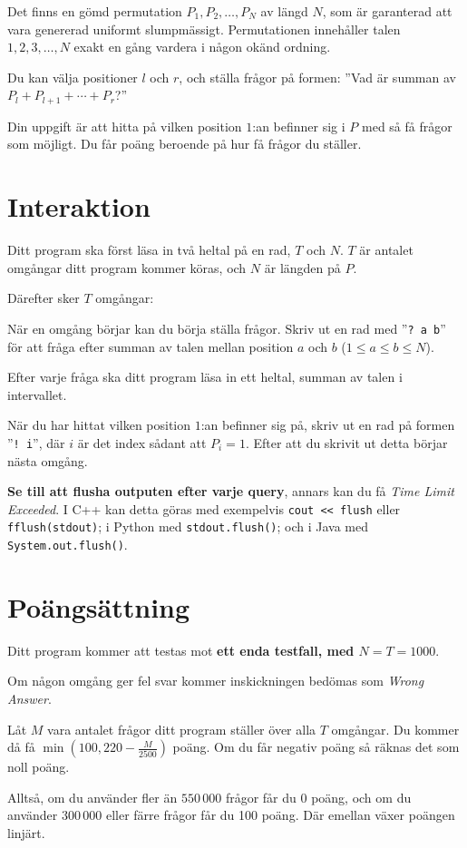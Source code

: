 
Det finns en gömd permutation $P_{1},P_{2},\ldots,P_{N}$ av längd $N$, som är garanterad att vara genererad uniformt slumpmässigt.
Permutationen innehåller talen $1, 2, 3, \ldots, N$ exakt en gång vardera i någon okänd ordning.

Du kan välja positioner $l$ och $r$, och ställa frågor på formen: ''Vad är summan av $P_l + P_{l+1} + \cdots + P_r$?''

Din uppgift är att hitta på vilken position $1$:an befinner sig i $P$ med så få frågor som möjligt.
Du får poäng beroende på hur få frågor du ställer.

\section*{Interaktion}

Ditt program ska först läsa in två heltal på en rad, $T$ och $N$. 
$T$ är antalet omgångar ditt program kommer köras, och $N$ är längden på $P$.

Därefter sker $T$ omgångar:

När en omgång börjar kan du börja ställa frågor. Skriv ut en rad med ''\verb|? a b|'' för
att fråga efter summan av talen mellan position $a$ och $b$ ($1 \leq a \leq b \leq N$).

Efter varje fråga ska ditt program läsa in ett heltal, summan av talen i intervallet.

När du har hittat vilken position $1$:an befinner sig på, skriv ut en rad på formen ''\verb|! i|'',
där $i$ är det index sådant att $P_i = 1$. Efter att du skrivit ut detta börjar nästa omgång.

\textbf{Se till att flusha outputen efter varje query}, annars kan du få \textit{Time Limit Exceeded}.
I C++ kan detta göras med exempelvis \texttt{cout << flush}
eller \texttt{fflush(stdout)};
i Python med \texttt{stdout.flush()};
och i Java med \texttt{System.out.flush()}.

\section*{Poängsättning}

Ditt program kommer att testas mot \textbf{ett enda testfall, med $N = T = 1000$}.

Om någon omgång ger fel svar kommer inskickningen bedömas som \textit{Wrong Answer}.

Låt $M$ vara antalet frågor ditt program ställer över alla $T$ omgångar. Du kommer då få
$\min(100, 220 - \frac{M}{2500})$ poäng. Om du får negativ poäng så räknas det som noll poäng.

Alltså, om du använder fler än $550\,000$ frågor får du 0 poäng, och
om du använder $300\,000$ eller färre frågor får du 100 poäng. Där emellan växer poängen linjärt.
